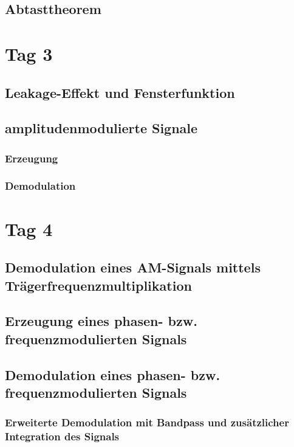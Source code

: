 \documentclass[
	a4paper,
	12pt,
	pagesize,
	ngerman
]{scrartcl}
\begin{document}
	\subsection{Abtasttheorem}
	
	\section{Tag 3} \label{Tag 3}
	
	\subsection{Leakage-Effekt und Fensterfunktion}
	
	\subsection{amplitudenmodulierte Signale} %
	
	\subsubsection{Erzeugung}
	
	\subsubsection{Demodulation}
	
	\section{Tag 4} \label{Tag 4}
	
	\subsection{Demodulation eines AM-Signals mittels Trägerfrequenzmultiplikation}
	
	\subsection{Erzeugung eines phasen- bzw. frequenzmodulierten Signals}
	
	\subsection{Demodulation eines phasen- bzw. frequenzmodulierten Signals}
	
	\subsubsection{Erweiterte Demodulation mit Bandpass und zusätzlicher Integration des Signals}
	
	
\end{document}

